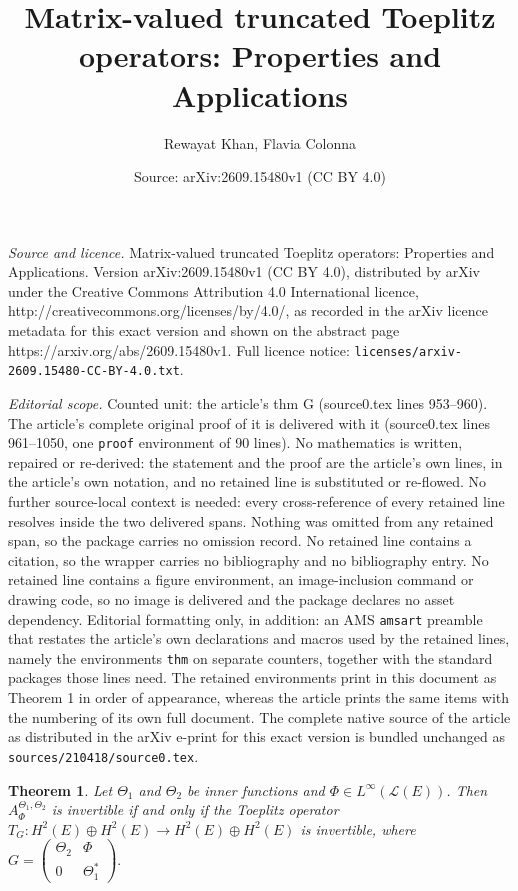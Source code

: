 \documentclass[10pt,a4paper]{amsart}
\title{Matrix-valued truncated Toeplitz operators: Properties and Applications}
\author{Rewayat Khan, Flavia Colonna}
\date{Source: arXiv:2609.15480v1 (CC BY 4.0)}
\newtheorem{thm}{Theorem}
\newcommand{\oL }{\mathcal{L}(E) }
\begin{document}
\maketitle

\noindent\emph{Source and licence.} Matrix-valued truncated Toeplitz operators: Properties and Applications. Version arXiv:2609.15480v1 (CC BY 4.0), distributed by arXiv under the Creative Commons Attribution 4.0 International licence, http://creativecommons.org/licenses/by/4.0/, as recorded in the arXiv licence metadata for this exact version and shown on the abstract page https://arxiv.org/abs/2609.15480v1. Full licence notice: \texttt{licenses/arxiv-2609.15480-CC-BY-4.0.txt}.\par\smallskip

\noindent\textit{Editorial scope.} Counted unit: the article's thm G (source0.tex lines 953--960). The article's complete original proof of it is delivered with it (source0.tex lines 961--1050, one \texttt{proof} environment of 90 lines). No mathematics is written, repaired or re-derived: the statement and the proof are the article's own lines, in the article's own notation, and no retained line is substituted or re-flowed.  No further source-local context is needed: every cross-reference of every retained line resolves inside the two delivered spans.  Nothing was omitted from any retained span, so the package carries no omission record.  No retained line contains a citation, so the wrapper carries no bibliography and no bibliography entry.  No retained line contains a figure environment, an image-inclusion command or drawing code, so no image is delivered and the package declares no asset dependency.  Editorial formatting only, in addition: an AMS \texttt{amsart} preamble that restates the article's own declarations and macros used by the retained lines, namely the environments \texttt{thm} on separate counters, together with the standard packages those lines need.  The retained environments print in this document as Theorem 1 in order of appearance, whereas the article prints the same items with the numbering of its own full document.  The complete native source of the article as distributed in the arXiv e-print for this exact version is bundled unchanged as \texttt{sources/210418/source0.tex}.
\begin{thm}\label{G} Let $\Theta_1$ and $\Theta_2$ be inner functions and 
 $\Phi\in L^{\infty}(\oL)$. Then $A_{\Phi}^{\Theta_{1},\Theta_{2}}$ is invertible if and only if the Toeplitz operator $T_{G}: H^2(E)\oplus H^2(E)\to H^2(E)\oplus H^2(E)$ is invertible,
where $G=\begin{pmatrix}
\Theta_{2}& \Phi\\
0&\Theta_{1}^{*}
\end{pmatrix}.
$
\end{thm}
\end{document}
